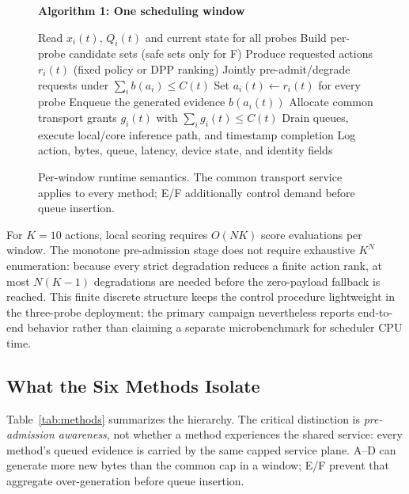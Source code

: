 \documentclass[10pt,journal]{IEEEtran}
\begin{document}
\begin{figure}[t]
\centering
\begin{minipage}{0.96\columnwidth}
\small
\textbf{Algorithm 1: One scheduling window}\par
\vspace{1mm}
\begin{algorithmic}[1]
\STATE Read $x_i(t)$, $Q_i(t)$ and current state for all probes
\STATE Build per-probe candidate sets (safe sets only for F)
\STATE Produce requested actions $r_i(t)$ (fixed policy or DPP ranking)
  \STATE Jointly pre-admit/degrade requests under $\sum_i b(a_i)\le C(t)$
\ELSE
  \STATE Set $a_i(t)\leftarrow r_i(t)$ for every probe
\ENDIF
\STATE Enqueue the generated evidence $b(a_i(t))$
\STATE Allocate common transport grants $g_i(t)$ with $\sum_i g_i(t)\le C(t)$
\STATE Drain queues, execute local/core inference path, and timestamp completion
\STATE Log action, bytes, queue, latency, device state, and identity fields
\end{algorithmic}
\end{minipage}
\caption{Per-window runtime semantics. The common transport service applies to every method; E/F additionally control demand before queue insertion.}
\label{alg:runtime}
\end{figure}

For $K=10$ actions, local scoring requires $O(NK)$ score evaluations per window. The monotone pre-admission stage does not require exhaustive $K^N$ enumeration: because every strict degradation reduces a finite action rank, at most $N(K-1)$ degradations are needed before the zero-payload fallback is reached. This finite discrete structure keeps the control procedure lightweight in the three-probe deployment; the primary campaign nevertheless reports end-to-end behavior rather than claiming a separate microbenchmark for scheduler CPU time.

\subsection{What the Six Methods Isolate}
Table~\ref{tab:methods} summarizes the hierarchy. The critical distinction is \emph{pre-admission awareness}, not whether a method experiences the shared service: every method's queued evidence is carried by the same capped service plane. A--D can generate more new bytes than the common cap in a window; E/F prevent that aggregate over-generation before queue insertion.
\end{document}
